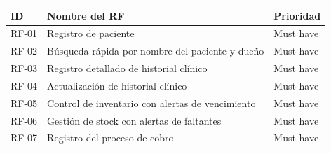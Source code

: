 \documentclass[
]{article}
\newcounter{none} %
\begin{document}
{\def\LTcaptype{none} %
\begin{longtable}[]{|
  >{\raggedleft\arraybackslash}p{}|
  >{\raggedright\arraybackslash}p{}|
  >{\raggedright\arraybackslash}p{}|}
\hline
\begin{minipage}[b]{\linewidth}\raggedleft
\textbf{ID}
\end{minipage} & \begin{minipage}[b]{\linewidth}\centering
\textbf{Nombre del RF}
\end{minipage} & \begin{minipage}[b]{\linewidth}\centering
\textbf{Prioridad}
\end{minipage} \\
\hline
\endhead
\hline
\endlastfoot
RF-01 & Registro de paciente &
\begin{minipage}[t]{\linewidth}\raggedright
Must have
\end{minipage} \\
\hline
RF-02 & Búsqueda rápida por nombre del paciente y dueño &
\begin{minipage}[t]{\linewidth}\raggedright
Must have
\end{minipage} \\
\hline
RF-03 & Registro detallado de historial clínico &
\begin{minipage}[t]{\linewidth}\raggedright
Must have
\end{minipage} \\
\hline
RF-04 & Actualización de historial clínico &
\begin{minipage}[t]{\linewidth}\raggedright
Must have
\end{minipage} \\
\hline
RF-05 & Control de inventario con alertas de vencimiento &
\begin{minipage}[t]{\linewidth}\raggedright
Must have
\end{minipage} \\
\hline
RF-06 & Gestión de stock con alertas de faltantes &
\begin{minipage}[t]{\linewidth}\raggedright
Must have
\end{minipage} \\
\hline
RF-07 & Registro del proceso de cobro &
\begin{minipage}[t]{\linewidth}\raggedright
Must have
\end{minipage} \\

\end{longtable}}
\end{document}
